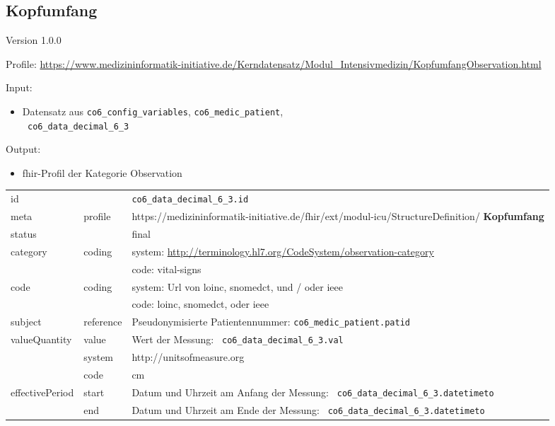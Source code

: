 \subsection{Kopfumfang} 
\noindent Version 1.0.0

\noindent Profile: \url{https://www.medizininformatik-initiative.de/Kerndatensatz/Modul_Intensivmedizin/KopfumfangObservation.html}

\noindent Input:
\begin{itemize}
	\item Datensatz aus \texttt{co6\_config\_variables}, \texttt{co6\_medic\_patient}, \\ \texttt{
co6\_data\_decimal\_6\_3}
\end{itemize}
Output:
\begin{itemize}
        \item \ac{fhir}-Profil der Kategorie \glqq Observation\grqq{}
\end{itemize}
\begin{longtable}{|l|l|p{7.5cm}|}
        \hline
        \rowcolor{lightgray} \multicolumn{3}{|l|}{Data Mapping (inhaltlich)} \\ \hline
        id &  & \texttt{co6\_data\_decimal\_6\_3.id} \\ \hline
	meta & profile & https://medizininformatik-initiative.de/fhir/ext/modul-icu/StructureDefinition/\textbf{
Kopfumfang} \\ \hline 
	status &  & final  \\ \hline 
	category & coding & system: \url{http://terminology.hl7.org/CodeSystem/observation-category} \\
\cline{3-3}
	& & code: vital-signs \\ \hline
	code & coding & system: Url von \ac{loinc}, \ac{snomedct}, und / oder \ac{ieee} \\ 
	\cline{3-3} 
	 &  & code: \ac{loinc}, \ac{snomedct}, oder \ac{ieee} \\ \hline
	subject & reference & Pseudonymisierte Patientennummer: \texttt{co6\_medic\_patient.patid} \\ \hline
	valueQuantity & value & Wert der Messung: \texttt{
co6\_data\_decimal\_6\_3.val} \\
        \cline{2-3}
         & system & http://unitsofmeasure.org \\
         \cline{2-3}
         & code & cm \\ \hline
    effectivePeriod & start & Datum und Uhrzeit am Anfang der Messung: \texttt{
co6\_data\_decimal\_6\_3.datetimeto} \\
    \cline{2-3}
     & end & Datum und Uhrzeit am Ende der Messung: \texttt{
co6\_data\_decimal\_6\_3.datetimeto} \\ \hline
\end{longtable}


